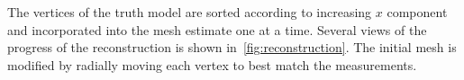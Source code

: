 \documentclass[letterpaper, paper,11pt]{AAS}		%
\begin{document}
The vertices of the truth model are sorted according to increasing \( x \) component and incorporated into the mesh estimate one at a time. 
Several views of the progress of the reconstruction is shown in~\cref{fig:reconstruction}.
The initial mesh is modified by radially moving each vertex to best match the measurements.
\begin{figure}[h]
    \centering
    ~

    ~


\end{figure}
\end{document}
